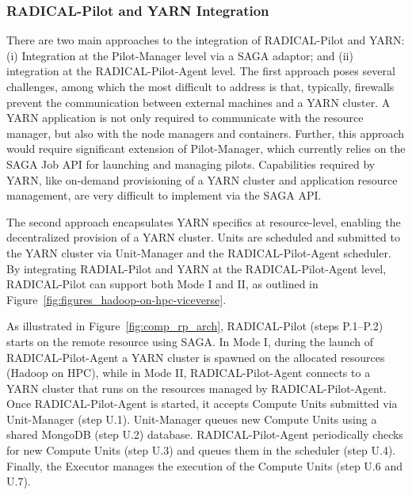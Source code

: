\subsubsection*{RADICAL-Pilot and YARN Integration}
\label{sssec:rp-yarn}

There are two main approaches to the integration of RADICAL-Pilot and YARN: (i)
Integration at the Pilot-Manager level via a SAGA adaptor; and (ii) integration
at the RADICAL-Pilot-Agent level. The first approach poses several challenges,
among which the most difficult to address is that, typically, firewalls prevent
the communication between external machines and a YARN cluster. A YARN
application is not only required to communicate with the resource manager, but
also with the node managers and containers. Further, this approach would require
significant extension of Pilot-Manager, which currently relies on the SAGA Job
API for launching and managing pilots. Capabilities required by YARN, like
on-demand provisioning of a YARN cluster and application resource management,
are very difficult to implement via the SAGA API.

The second approach encapsulates YARN specifics at resource-level, enabling the
decentralized provision of a YARN cluster. Units are scheduled and submitted to
the YARN cluster via Unit-Manager and the RADICAL-Pilot-Agent scheduler. By
integrating RADIAL-Pilot and YARN at the RADICAL-Pilot-Agent level,
RADICAL-Pilot can support both Mode I and II, as outlined in
Figure~\ref{fig:figures_hadoop-on-hpc-viceverse}.

As illustrated in Figure~\ref{fig:comp_rp_arch}, RADICAL-Pilot (steps P.1--P.2)
starts on the remote resource using SAGA. In Mode I, during the launch of
RADICAL-Pilot-Agent a YARN cluster is spawned on the allocated resources (Hadoop
on HPC), while in Mode II, RADICAL-Pilot-Agent connects to a YARN cluster that
runs on the resources managed by RADICAL-Pilot-Agent. Once RADICAL-Pilot-Agent
is started, it accepts Compute Units submitted via Unit-Manager (step U.1).
Unit-Manager queues new Compute Units using a shared MongoDB (step U.2)
database. RADICAL-Pilot-Agent periodically checks for new Compute Units (step
U.3) and queues them in the scheduler (step U.4). Finally, the Executor manages
the execution of the Compute Units (step U.6 and U.7).

